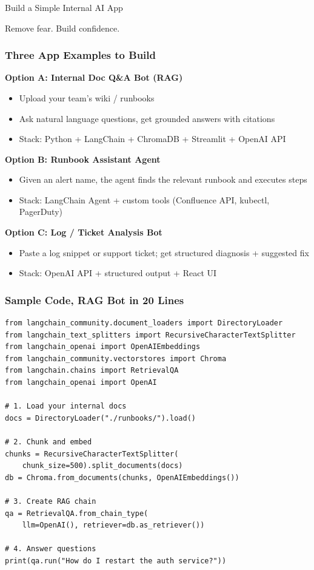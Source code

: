 \begin{frame}[fragile]\frametitle{}
\begin{center}
{\Large Build a Simple Internal AI App}

{\small Remove fear. Build confidence.}
\end{center}
\end{frame}

\begin{frame}[fragile]\frametitle{Three App Examples to Build}
\textbf{Option A: Internal Doc Q\&A Bot (RAG)}
\begin{itemize}
\item Upload your team's wiki / runbooks
\item Ask natural language questions, get grounded answers with citations
\item Stack: Python + LangChain + ChromaDB + Streamlit + OpenAI API
\end{itemize}

\textbf{Option B: Runbook Assistant Agent}
\begin{itemize}
\item Given an alert name, the agent finds the relevant runbook and executes steps
\item Stack: LangChain Agent + custom tools (Confluence API, kubectl, PagerDuty)
\end{itemize}

\textbf{Option C: Log / Ticket Analysis Bot}
\begin{itemize}
\item Paste a log snippet or support ticket; get structured diagnosis + suggested fix
\item Stack: OpenAI API + structured output + React UI
\end{itemize}
\end{frame}

\begin{frame}[fragile]\frametitle{Sample Code, RAG Bot in 20 Lines}
\begin{lstlisting}
from langchain_community.document_loaders import DirectoryLoader
from langchain_text_splitters import RecursiveCharacterTextSplitter
from langchain_openai import OpenAIEmbeddings
from langchain_community.vectorstores import Chroma
from langchain.chains import RetrievalQA
from langchain_openai import OpenAI

# 1. Load your internal docs
docs = DirectoryLoader("./runbooks/").load()

# 2. Chunk and embed
chunks = RecursiveCharacterTextSplitter(
    chunk_size=500).split_documents(docs)
db = Chroma.from_documents(chunks, OpenAIEmbeddings())

# 3. Create RAG chain
qa = RetrievalQA.from_chain_type(
    llm=OpenAI(), retriever=db.as_retriever())

# 4. Answer questions
print(qa.run("How do I restart the auth service?"))
\end{lstlisting}
\end{frame}


